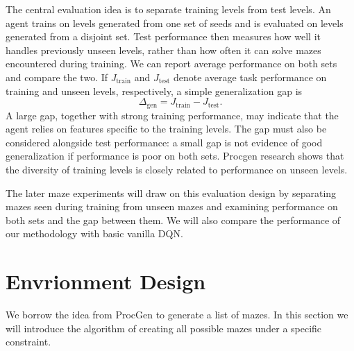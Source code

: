 \documentclass[a4paper,12pt]{article}
\begin{document}
The central evaluation idea is to separate training levels from test levels. An agent trains on levels generated from one set of seeds and is evaluated on levels generated from a disjoint set. Test performance then measures how well it handles previously unseen levels, rather than how often it can solve mazes encountered during training. We can report average performance on both sets and compare the two. If $J_{\mathrm{train}}$ and $J_{\mathrm{test}}$ denote average task performance on training and unseen levels, respectively, a simple generalization gap is
\begin{equation}
    \Delta_{\mathrm{gen}} = J_{\mathrm{train}} - J_{\mathrm{test}}.
\end{equation}
A large gap, together with strong training performance, may indicate that the agent relies on features specific to the training levels. The gap must also be considered alongside test performance: a small gap is not evidence of good generalization if performance is poor on both sets. Procgen research shows that the diversity of training levels is closely related to performance on unseen levels\cite{cobbe2020,openai2019}.

The later maze experiments will draw on this evaluation design by separating mazes seen during training from unseen mazes and examining performance on both sets and the gap between them. We will also compare the performance of our methodology with basic vanilla DQN.

\section{Envrionment Design}

We borrow the idea from ProcGen\cite{cobbe2020,openai2019} to generate a list of mazes. In this section we will introduce the algorithm of creating all possible mazes under a specific constraint.
\end{document}
